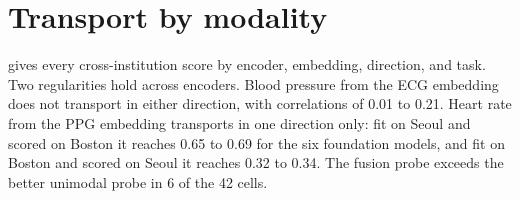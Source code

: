 \documentclass[pmlr,twocolumn,10pt]{jmlr}
\begin{document}


\clearpage
\appendix

\section{Transport by modality}
\label{apx:transport}

 gives every cross-institution score by encoder, embedding, direction, and task. Two regularities hold across encoders. Blood pressure from the ECG embedding does not transport in either direction, with correlations of 0.01 to 0.21. Heart rate from the PPG embedding transports in one direction only: fit on Seoul and scored on Boston it reaches 0.65 to 0.69 for the six foundation models, and fit on Boston and scored on Seoul it reaches 0.32 to 0.34. The fusion probe exceeds the better unimodal probe in 6 of the 42 cells.
\end{document}
